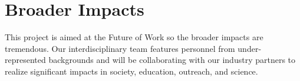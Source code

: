 
\section*{Broader Impacts} %
\label{sec:broaderImpacts}


This project is aimed at the Future of Work so the broader impacts are tremendous. Our
interdisciplinary team features personnel from under-represented backgrounds and will be
collaborating with our industry partners to realize significant impacts in society,
education, outreach, and science.

